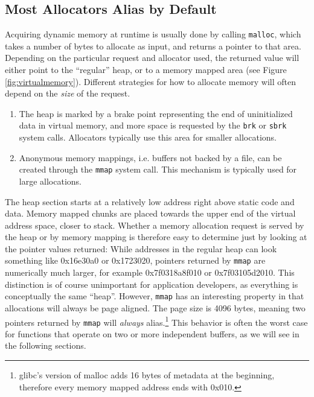 \documentclass[prodmode,acmtaco]{acmsmall}
\begin{document}
{\subsection{Most Allocators Alias by Default}
Acquiring dynamic memory at runtime is usually done by calling \texttt{malloc}, which takes a number of bytes to allocate as input, and returns a pointer to that area.
Depending on the particular request and allocator used, the returned value will either point to the ``regular'' heap, or to a memory mapped area (see Figure \ref{fig:virtualmemory}).
Different strategies for how to allocate memory will often depend on the \emph{size} of the request.

\begin{enumerate}
  \item The heap is marked by a brake point representing the end of uninitialized data in virtual memory, and more space is requested by the \texttt{brk} or \texttt{sbrk} system calls. 
  Allocators typically use this area for smaller allocations.
  \item Anonymous memory mappings, i.e. buffers not backed by a file, can be created through the \texttt{mmap} system call.
  This mechanism is typically used for large allocations.
\end{enumerate}

The heap section starts at a relatively low address right above static code and data.
Memory mapped chunks are placed towards the upper end of the virtual address space, closer to stack.
Whether a memory allocation request is served by the heap or by memory mapping is therefore easy to determine just by looking at the pointer values returned:
While addresses in the regular heap can look something like 0x16e30a0 or 0x1723020, pointers returned by \texttt{mmap} are numerically much larger, for example 0x7f0318a8f010 or 0x7f03105d2010.
This distinction is of course unimportant for application developers, as everything is conceptually the same ``heap''.
However, \texttt{mmap} has an interesting property in that allocations will always be page aligned.
The page size is 4096 bytes, meaning two pointers returned by \texttt{mmap} will \emph{always} alias.\footnote{glibc's version of malloc adds 16 bytes of metadata at the beginning, therefore every memory mapped address ends with 0x010.}
This behavior is often the worst case for functions that operate on two or more independent buffers, as we will see in the following sections.

}
\end{document}
